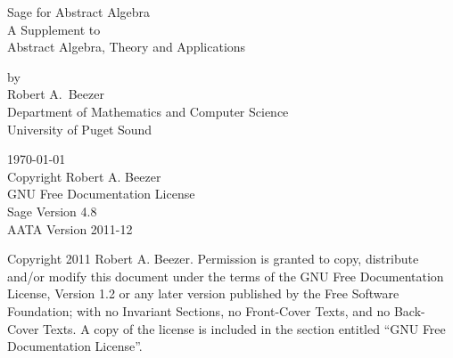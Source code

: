 \documentclass[12pt,oneside]{book}
\begin{document}
\thispagestyle{empty}
\begin{center}
{\fontsize{24}{24}\selectfont%
Sage for Abstract Algebra\\[24pt]
A Supplement to\\[6pt]
Abstract Algebra, Theory and Applications}
\par
{}
%
{\large by\\Robert A.\ Beezer\\Department of Mathematics and Computer Science\\University of Puget Sound}\par
%
%
%
\today\\
Copyright Robert A. Beezer\\
GNU Free Documentation License\\[12pt]
Sage Version 4.8\\
AATA Version 2011-12
%
\end{center}
\newpage
\thispagestyle{empty}
\noindent
Copyright 2011 Robert A. Beezer. Permission is granted to copy, distribute
and/or modify this document under the terms of the GNU Free
Documentation License, Version 1.2 or any later version published by the
Free Software Foundation; with no Invariant Sections, no Front-Cover
Texts, and no Back-Cover Texts. A copy of the license is included in the
section entitled ``GNU Free Documentation License''.
\par
{}
\newpage
\thispagestyle{empty}
\tableofcontents
\newpage
\thispagestyle{empty}
\end{document}
